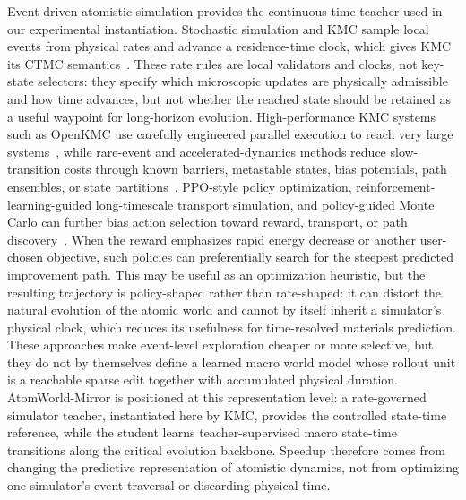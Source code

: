 \documentclass{article}
\begin{document}
Event-driven atomistic simulation provides the continuous-time teacher used in our experimental instantiation. Stochastic simulation and KMC sample local events from physical rates and advance a residence-time clock, which gives KMC its CTMC semantics~\cite{bortz1975nfold,gillespie1977exact,fichthorn1991dmc,chatterjee2007kmc}. These rate rules are local validators and clocks, not key-state selectors: they specify which microscopic updates are physically admissible and how time advances, but not whether the reached state should be retained as a useful waypoint for long-horizon evolution. High-performance KMC systems such as OpenKMC use carefully engineered parallel execution to reach very large systems~\cite{li2019openkmc}, while rare-event and accelerated-dynamics methods reduce slow-transition costs through known barriers, metastable states, bias potentials, path ensembles, or state partitions~\cite{voter1997hyperdynamics,voter1998parallelreplica,sorensen2000tad,henkelman2000neb,henkelman2001akmc,laio2002metadynamics,bolhuis2002tps,zamora2016spectad,liu2023trps,lin2019partialscaling}. PPO-style policy optimization, reinforcement-learning-guided long-timescale transport simulation, and policy-guided Monte Carlo can further bias action selection toward reward, transport, or path discovery~\cite{schulman2017ppo,tang2024tks,bojesen2018pgmc}. When the reward emphasizes rapid energy decrease or another user-chosen objective, such policies can preferentially search for the steepest predicted improvement path. This may be useful as an optimization heuristic, but the resulting trajectory is policy-shaped rather than rate-shaped: it can distort the natural evolution of the atomic world and cannot by itself inherit a simulator's physical clock, which reduces its usefulness for time-resolved materials prediction. These approaches make event-level exploration cheaper or more selective, but they do not by themselves define a learned macro world model whose rollout unit is a reachable sparse edit together with accumulated physical duration. AtomWorld-Mirror is positioned at this representation level: a rate-governed simulator teacher, instantiated here by KMC, provides the controlled state-time reference, while the student learns teacher-supervised macro state-time transitions along the critical evolution backbone. Speedup therefore comes from changing the predictive representation of atomistic dynamics, not from optimizing one simulator's event traversal or discarding physical time.

\newpage

\end{document}
